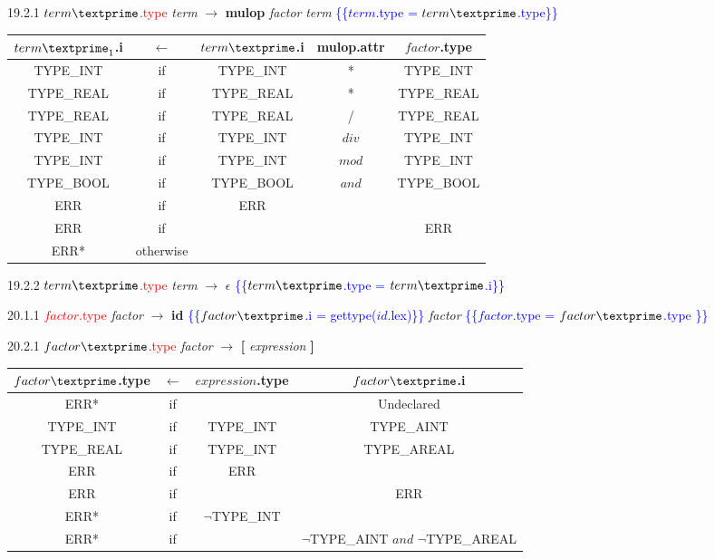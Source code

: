 19.2.1 \textcolor{red}{$term\textprime$.type} \emph{term\textprime} $\rightarrow$ \textbf{mulop} \emph{factor} \emph{term\textprime} \textcolor{blue}{\{\{$term$.type = $term\textprime$.type\}\}}

\begin{tabular}[t]{|c|c|c|c|c|}
  \hline

 $term\textprime_1$.i & \textbf{$\leftarrow$} & $term\textprime$.i & \textbf{mulop}.attr &  $factor$.type \\

  \hline

  TYPE_INT & if & TYPE_INT & * & TYPE_INT \\
  TYPE_REAL & if & TYPE_REAL & * & TYPE_REAL \\
  TYPE_REAL & if & TYPE_REAL & / & TYPE_REAL \\
  TYPE_INT & if & TYPE_INT & $div$ & TYPE_INT \\
  TYPE_INT & if & TYPE_INT & $mod$ & TYPE_INT \\
  TYPE_BOOL & if & TYPE_BOOL & $and$ & TYPE_BOOL \\
  ERR & if & ERR & & \\
  ERR & if & & & ERR \\
  ERR* & otherwise & & & \\
  \hline

\end{tabular}

19.2.2 \textcolor{red}{$term\textprime$.type} \emph{term\textprime} $\rightarrow$ $\epsilon$ \textcolor{blue}{\{\{$term\textprime$.type = $term\textprime$.i\}\}}

\clearpage{}
20.1.1 \textcolor{red}{$factor$.type} \emph{factor} $\rightarrow$ \textbf{id} \textcolor{blue}{\{\{$factor\textprime$.i = gettype($id$.lex)\}\}} \emph{factor\textprime} \textcolor{blue}{\{\{$factor$.type = $factor\textprime$.type \}\}}

20.2.1 \textcolor{red}{$factor\textprime$.type} \emph{factor\textprime} $\rightarrow$ \textbf{[} \emph{expression} \textbf{]}

\begin{tabular}[t]{|c|c|c|c|}
  \hline

  $factor\textprime$.type & \textbf{$\leftarrow$} & $expression$.type & $factor\textprime$.i \\

  \hline
  ERR* & if & & Undeclared \\
  TYPE_INT & if & TYPE_INT & TYPE_AINT \\
  TYPE_REAL & if & TYPE_INT & TYPE_AREAL \\
  ERR & if & ERR & \\
  ERR & if & & ERR \\
  ERR* & if & $\neg$TYPE_INT & \\
  ERR* & if & & $\neg$TYPE_AINT $and$ $\neg$TYPE_AREAL \\

  \hline

\end{tabular}

